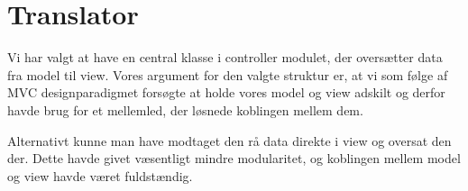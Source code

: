 \section{Translator}

Vi har valgt at have en central klasse i controller modulet, der oversætter data fra model til view. Vores argument for den valgte struktur er, at vi som følge af MVC designparadigmet forsøgte at holde vores model og view adskilt og derfor havde brug for et mellemled, der løsnede koblingen mellem dem.

Alternativt kunne man have modtaget den rå data direkte i view og oversat den der. Dette havde givet væsentligt mindre modularitet, og koblingen mellem model og view havde været fuldstændig.